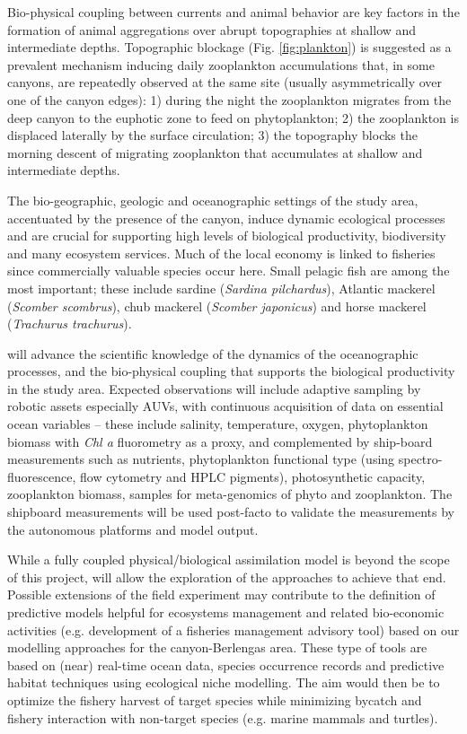 Bio-physical coupling between currents and animal behavior are key
factors in the formation of animal aggregations over abrupt
topographies at shallow and intermediate depths. Topographic blockage
(Fig. \ref{fig:plankton}) is suggested as a prevalent mechanism
inducing daily zooplankton accumulations that, in some canyons, are
repeatedly observed at the same site (usually asymmetrically over one
of the canyon edges): 1) during the night the zooplankton migrates
from the deep canyon to the euphotic zone to feed on phytoplankton; 2)
the zooplankton is displaced laterally by the surface circulation; 3)
the topography blocks the morning descent of migrating zooplankton
that accumulates at shallow and intermediate depths.

The bio-geographic, geologic and oceanographic settings of the study
area, accentuated by the presence of the \naz canyon, induce dynamic
ecological processes and are crucial for supporting high levels of
biological productivity, biodiversity and many ecosystem
services. Much of the local economy is linked to fisheries since
commercially valuable species occur here. Small pelagic fish are among
the most important; these include sardine (\emph{Sardina pilchardus}),
Atlantic mackerel (\emph{Scomber scombrus}), chub mackerel
(\emph{Scomber japonicus}) and horse mackerel (\emph{Trachurus
  trachurus}).

\proj will advance the scientific knowledge of the dynamics of the
oceanographic processes, and the bio-physical coupling that supports
the biological productivity in the study area. Expected observations
will include adaptive sampling by robotic assets especially AUVs, with
continuous acquisition of data on essential ocean variables -- these
include salinity, temperature, oxygen, phytoplankton biomass with
\emph{Chl a} fluorometry as a proxy, and complemented by ship-board
measurements such as nutrients, phytoplankton functional type (using
spectro-fluorescence, flow cytometry and HPLC pigments), photosynthetic
capacity, zooplankton biomass, samples for meta-genomics of phyto and
zooplankton.  The shipboard measurements will be used post-facto to
validate the measurements by the autonomous platforms and model
output.

While a fully coupled physical/biological assimilation model is beyond
the scope of this project, \proj will allow the exploration of the
approaches to achieve that end.  Possible extensions of the field
experiment may contribute to the definition of predictive models
helpful for ecosystems management and related bio-economic activities
(e.g. development of a fisheries management advisory tool) based on
our modelling approaches for the \naz canyon-Berlengas area. These
type of tools are based on (near) real-time ocean data, species
occurrence records and predictive habitat techniques using ecological
niche modelling. The aim would then be to optimize the fishery harvest
of target species while minimizing bycatch and fishery interaction
with non-target species (e.g. marine mammals and turtles).


